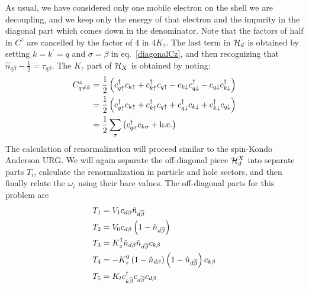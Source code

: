 \documentclass[12pt,twoside]{article}
\numberwithin{equation}{section}
\begin{document}
As usual, we have considered only one mobile electron on the shell we are decoupling, and we keep only the energy of that electron and the impurity in the diagonal part which comes down in the denominator.
Note that the factors of half in \(C^z\) are cancelled by the factor of \(4\) in \(4K_z\).
The last term in \(\mathcal{H}_d\) is obtained by setting \(k=k^\prime=q\) and \(\sigma=\beta\) in eq.~\ref{diagonalCz}, and then recognizing that \(\hat n_{q\beta} - \frac{1}{2} = \tau_{q\beta}\).
The \(K_z\) part of \(\mathcal{H}_X\) is obtained by noting:
\begin{equation}\begin{aligned}
	C^z_{q\neq k} &= \frac{1}{2}\left({c^\dagger_{q\uparrow}c_{k \uparrow} + c^\dagger_{k\uparrow}c_{q \uparrow} - c_{k\downarrow}c^\dagger_{q \downarrow} - c_{q\downarrow}c^\dagger_{k\downarrow}}\right) \\
	&= \frac{1}{2}\left({c^\dagger_{q\uparrow}c_{k \uparrow} + c^\dagger_{k\uparrow}c_{q \uparrow} + c^\dagger_{q \downarrow}c_{k\downarrow} + c^\dagger_{k\downarrow}c_{q\downarrow}}\right)\\
	&= \frac{1}{2}\sum_{\sigma}\left(c^\dagger_{q\sigma}c_{k\sigma} + \text{h.c.}\right)
\end{aligned}\end{equation}
The calculation of renormalization will proceed similar to the spin-Kondo Anderson URG.
We will again separate the off-diagonal piece \(\mathcal{H}_d^X\) into separate parts \(T_i\), calculate the renormalization in particle and hole sectors, and then finally relate the \(\omega_i\) using their bare values.
The off-diagonal parts for this problem are
\begin{equation}\begin{aligned}
	T_1 &= V_1 c_{d\beta}\hat n_{d\overline\beta}\\
	T_2 &= V_0 c_{d\beta}\left(1 - \hat n_{d\overline\beta}\right)\\
	T_3 &= K_z^1 \hat n_{d\beta}\hat n_{d\overline\beta}c_{k\beta}\\
	T_4 &= -K_z^0 \left(1 - \hat n_{d\beta}\right)\left(1 - \hat n_{d\overline\beta}\right)c_{k\beta}\\
	T_5 &= K_t c^\dagger_{k\overline\beta}c_{d\overline\beta}c_{d\beta}\\
\end{aligned}\end{equation}
\end{document}
